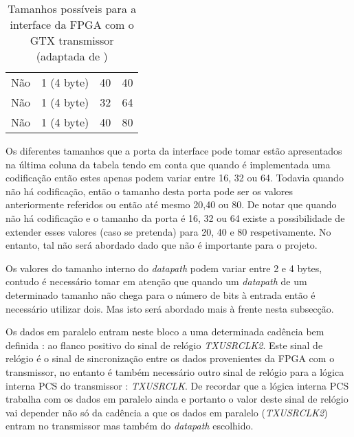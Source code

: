 \begin{table}[h!]
{\begin{tabular}{rlll}
			\multicolumn{1}{r|}{Não}                        & 1 (4 byte)                                       & 40                                           & 40                                                \\
			\multicolumn{1}{r|}{Não}                        & 1 (4 byte)                                       & 32                                           & 64                                                \\
			\multicolumn{1}{r|}{Não}                        & 1 (4 byte)                                       & 40                                           & 80                                                \\ \hline
		\end{tabular}%
	}
	\caption[Tamanhos possíveis para a interface da FPGA com o GTX transmissor]{Tamanhos possíveis para a interface da FPGA com o GTX transmissor (adaptada de \cite{R011})}
	\label{table:tx_interface}
\end{table}

Os diferentes tamanhos que a porta da interface pode tomar estão apresentados na última coluna da tabela tendo em conta que quando é implementada uma codificação então estes apenas podem variar entre 16, 32 ou 64. Todavia quando não há codificação, então o tamanho desta porta pode ser os valores anteriormente referidos ou então até mesmo 20,40 ou 80. De notar que quando não há codificação e o tamanho da porta é 16, 32 ou 64 existe a possibilidade de extender esses valores (caso se pretenda) para 20, 40 e 80 respetivamente. No entanto, tal não será abordado dado que não é importante para o projeto. 

Os valores do tamanho interno do \textit{datapath} podem variar entre 2 e 4 bytes, contudo é necessário tomar em atenção que quando um \textit{datapath} de um determinado tamanho não chega para o número de bits à entrada então é necessário utilizar dois. Mas isto será abordado mais à frente nesta subsecção. 

Os dados em paralelo entram neste bloco a uma determinada cadência bem definida : ao flanco positivo do sinal de relógio \textit{TXUSRCLK2}. Este sinal de relógio é o sinal de sincronização entre os dados provenientes da FPGA com o transmissor, no entanto é também necessário outro sinal de relógio para a lógica interna PCS do transmissor : \textit{TXUSRCLK}. De recordar que a lógica interna PCS trabalha com os dados em paralelo ainda e portanto o valor deste sinal de relógio vai depender não só da cadência a que os dados em paralelo (\textit{TXUSRCLK2}) entram no transmissor mas também do \textit{datapath} escolhido.

